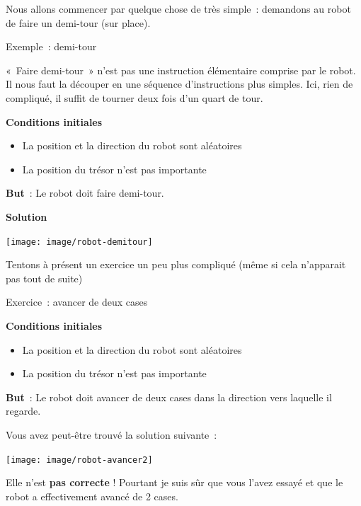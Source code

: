 	Nous allons commencer par quelque chose de très simple~: demandons au
	robot de faire un demi-tour (sur place).

	\begin{Emphase}[exercice]{Exemple~: demi-tour}

		«~Faire demi-tour~» n'est pas une instruction
		élémentaire comprise par le robot. Il nous faut la découper en une
		séquence d'instructions plus simples. Ici, rien de
		compliqué, il suffit de tourner deux fois d'un quart
		de tour.

		\textbf{Conditions initiales}

		\begin{itemize}
		\item La position et la direction du robot sont aléatoires
		\item La position du trésor n'est pas importante
		\end{itemize}

		\textbf{But}~: Le robot doit faire demi-tour.

		\textbf{Solution}
		
		\texttt{[image: image/robot-demitour]}
		
	\end{Emphase}

	Tentons à présent un exercice un peu plus compliqué
	(même si cela n'apparait pas tout de suite)

	
	\begin{Emphase}[exercice]{Exercice~: avancer de deux cases}

		\textbf{Conditions initiales}

		\begin{itemize}
		\item La position et la direction du robot sont aléatoires
		\item La position du trésor n'est pas importante
		\end{itemize}
		
		\textbf{But}~: Le robot doit avancer de deux cases dans la direction
		vers laquelle il regarde.

	\end{Emphase}

	Vous avez peut-être trouvé la solution suivante~:
		
	\texttt{[image: image/robot-avancer2]}
	
	Elle n'est \textbf{pas correcte} ! Pourtant je suis sûr
	que vous l'avez essayé et que le robot a effectivement
	avancé de 2 cases. 
	
